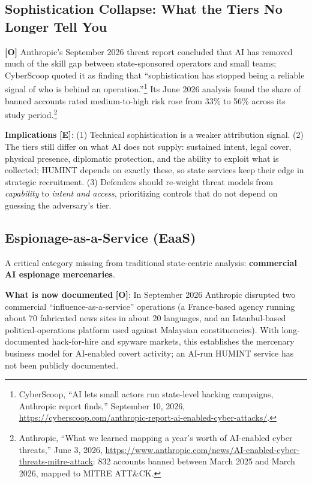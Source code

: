\documentclass[11pt,letterpaper]{article}
\begin{document}
\subsection{Sophistication Collapse: What the Tiers No Longer Tell You}

\textbf{[O]} Anthropic's September 2026 threat report concluded that AI has removed much of the skill gap between state-sponsored operators and small teams; CyberScoop quoted it as finding that ``sophistication has stopped being a reliable signal of who is behind an operation.''\footnote{CyberScoop, ``AI lets small actors run state-level hacking campaigns, Anthropic report finds,'' September 10, 2026, \url{https://cyberscoop.com/anthropic-report-ai-enabled-cyber-attacks/}.} Its June 2026 analysis found the share of banned accounts rated medium-to-high risk rose from 33\% to 56\% across its study period.\footnote{Anthropic, ``What we learned mapping a year's worth of AI-enabled cyber threats,'' June 3, 2026, \url{https://www.anthropic.com/news/AI-enabled-cyber-threats-mitre-attack}: 832 accounts banned between March 2025 and March 2026, mapped to MITRE ATT\&CK.}

\textbf{Implications} \textbf{[E]}: (1) Technical sophistication is a weaker attribution signal. (2) The tiers still differ on what AI does not supply: sustained intent, legal cover, physical presence, diplomatic protection, and the ability to exploit what is collected; HUMINT depends on exactly these, so state services keep their edge in strategic recruitment. (3) Defenders should re-weight threat models from \textit{capability} to \textit{intent and access}, prioritizing controls that do not depend on guessing the adversary's tier.

\subsection{Espionage-as-a-Service (EaaS)}

A critical category missing from traditional state-centric analysis: \textbf{commercial AI espionage mercenaries}.

\textbf{What is now documented} \textbf{[O]}: In September 2026 Anthropic disrupted two commercial ``influence-as-a-service'' operations (a France-based agency running about 70 fabricated news sites in about 20 languages, and an Istanbul-based political-operations platform used against Malaysian constituencies). With long-documented hack-for-hire and spyware markets, this establishes the mercenary business model for AI-enabled covert activity; an AI-run HUMINT service has not been publicly documented.
\end{document}
